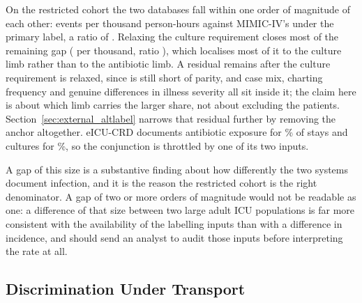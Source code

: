 On the restricted cohort the two databases fall within one order of magnitude
of each other: \pcExtRateEicuB{} events per thousand person-hours against
MIMIC-IV's \pcExtRateMimicB{} under the primary label, a ratio of
\pcExtRateRatioB. Relaxing the culture requirement closes most of the remaining
gap (\pcExtRateEicuAbxB{} per thousand, ratio \pcExtRateRatioAbxB),
which localises most of it to the culture limb rather than to the antibiotic
limb. A residual remains after the culture requirement is relaxed, since
\pcExtRateRatioAbxB{} is still short of parity, and case mix, charting
frequency and genuine differences in illness severity all sit inside it; the
claim here is about which limb carries the larger share, not about excluding
the patients. Section~\ref{sec:external_altlabel} narrows that residual
further by removing the anchor altogether. eICU-CRD documents antibiotic
exposure for \pcExtAbxCoverage\% of stays and cultures for
\pcExtMicroCoverage\%, so the conjunction is throttled by one of its two
inputs.

A gap of this size is a substantive finding about how differently the two
systems document infection, and it is the reason the restricted cohort is the
right denominator. A gap of two or more orders of magnitude would not be
readable as one: a difference of that size between two large adult ICU
populations is far more consistent with the availability of the labelling
inputs than with a difference in incidence, and should send an analyst to audit
those inputs before interpreting the rate at all.

\subsection{Discrimination Under Transport}

